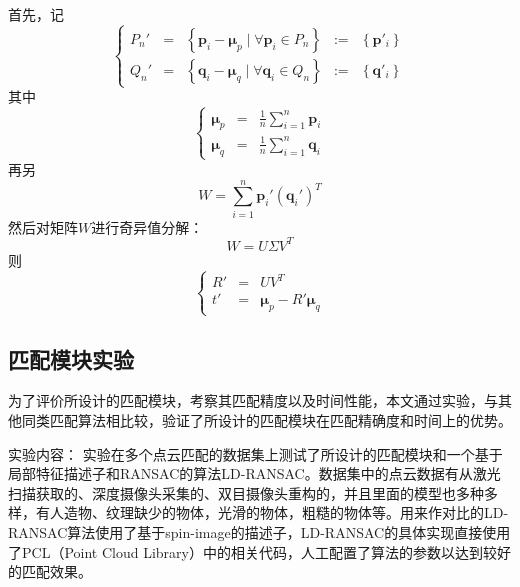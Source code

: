 首先，记
\begin{equation}
  \left\{
  \begin{array}{ccccc}
  P_n'& = &\left\{\mathbf{p}_i-\mathbf{\mu}_p \;|\; \forall \mathbf{p}_i \in P_n\right\}&:=&\left\{\mathbf{p}'_i\right\}\\
  Q_n'& = &\left\{\mathbf{q}_i-\mathbf{\mu}_q \;|\; \forall \mathbf{q}_i \in Q_n\right\}&:=&\left\{\mathbf{q}'_i\right\}
  \end{array}
  \right.
\end{equation}
其中
\begin{equation}
  \left\{
    \begin{array}{ccc}
      \mathbf{\mu}_p&=&\frac{1}{n}\sum_{i=1}^n{\mathbf{p}_i}\\
      \mathbf{\mu}_q&=&\frac{1}{n}\sum_{i=1}^n{\mathbf{q}_i}
    \end{array}
  \right.
\end{equation}
再另
\begin{equation}
  W = \sum_{i=1}^n{\mathbf{p}_i'(\mathbf{q}_i')^T}
\end{equation}
然后对矩阵$W$进行奇异值分解：
\begin{equation}
  W = U\Sigma V^T
\end{equation}
则
\begin{equation}
  \left\{
    \begin{array}{ccc}
      R'&=&UV^T \\
        t'&=&\mathbf{\mu}_p-R'\mathbf{\mu}_q
    \end{array}
    \right.
\end{equation}

\subsection{匹配模块实验}
\label{sec:matcher_exp}
为了评价所设计的匹配模块，考察其匹配精度以及时间性能，本文通过实验，与其他同类匹配算法相比较，验证了所设计的匹配模块在匹配精确度和时间上的优势。

{\kai 实验内容}：
实验在多个点云匹配的数据集上测试了所设计的匹配模块和一个基于局部特征描述子和RANSAC的算法LD-RANSAC\cite{li2005multiscale}。数据集中的点云数据有从激光扫描获取的、深度摄像头采集的、双目摄像头重构的，并且里面的模型也多种多样，有人造物、纹理缺少的物体，光滑的物体，粗糙的物体等。用来作对比的LD-RANSAC算法使用了基于spin-image的描述子\cite{johnson1999using}，LD-RANSAC的具体实现直接使用了PCL（Point Cloud Library）中的相关代码，人工配置了算法的参数以达到较好的匹配效果。

